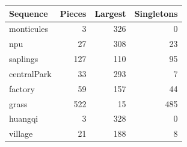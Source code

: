 \begin{tabular}{lrrr}
\toprule
Sequence & Pieces & Largest & Singletons \\
\midrule
monticules & 3 & 326 & 0 \\
npu & 27 & 308 & 23 \\
saplings & 127 & 110 & 95 \\
centralPark & 33 & 293 & 7 \\
factory & 59 & 157 & 44 \\
grass & 522 & 15 & 485 \\
huangqi & 3 & 328 & 0 \\
village & 21 & 188 & 8 \\
\bottomrule
\end{tabular}
